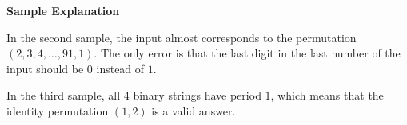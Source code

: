 \textbf{Sample Explanation}


In the second sample, the input almost corresponds to the permutation $(2,3,4,\dots, 91, 1)$. The only error is that the last digit in the last number 
of the input should be $0$ instead of $1$.

In the third sample, all $4$ binary strings have period $1$, which means that the identity permutation $(1,2)$ is a valid answer.